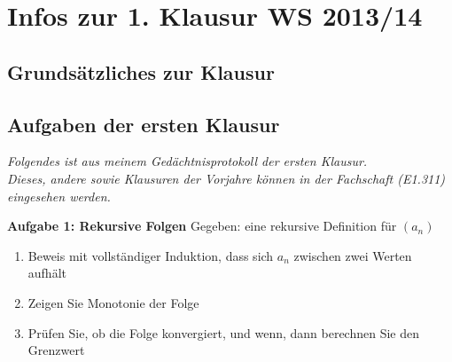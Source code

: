 \fancyhead[R]{}

{}
\chapter*{Infos zur 1. Klausur WS 2013/14}
\section*{Grundsätzliches zur Klausur}

\section*{Aufgaben der ersten Klausur}
\emph{Folgendes ist aus meinem Gedächtnisprotokoll der ersten Klausur.\\
Dieses, andere sowie Klausuren der Vorjahre können in der Fachschaft (E1.311) eingesehen werden.}\nl

\noindent \textbf{Aufgabe 1: Rekursive Folgen}\newline
Gegeben: eine rekursive Definition für $(a_n)$
\begin{enumerate}[label=(\alph*)]
\item Beweis mit vollständiger Induktion, dass sich $a_n$ zwischen zwei Werten aufhält
\item Zeigen Sie Monotonie der Folge
\item Prüfen Sie, ob die Folge konvergiert, und wenn, dann berechnen Sie den Grenzwert
\end{enumerate}

